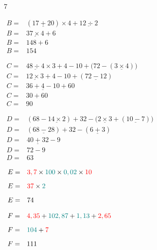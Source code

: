\documentclass[a4paper]{book}
\begin{document}
{\begin{exerciceNote}{7}
\begin{minipage}{0.3\linewidth}
            $\begin{array}{ll}
                B = & (\underline{17+20})\times 4 + \underline{12\div2} \\[2ex]
                B = & \underline{37\times4}+6\\[2ex]
                B = & 148+6\\[2ex]
                B = & 154
            \end{array}$  
        \end{minipage}
        \vline
        \begin{minipage}{0.35\linewidth}
            $\begin{array}{ll}
                C = & \underline{48\div4}\times3+4-10+\bigg(72-(\underline{3\times4})\bigg) \\[2ex]
                C = & \underline{12\times3}+4-10+(\underline{72-12})\\[2ex]
                C = & \underline{36+4-10}+60\\[2ex]
                C = & 30+60\\[2ex]
                C = & 90
            \end{array}$

            \bigskip

            $\begin{array}{ll}
                D = & (68-\underline{14\times2})+32-\big(\underline{2\times3}+(\underline{10-7})\big) \\[2ex]
                D = & (\underline{68-28})+32-(\underline{6+3})\\[2ex]
                D = & \underline{40+32}-9\\[2ex]
                D = & 72-9\\[2ex]
                D = & 63
            \end{array}$
        \end{minipage}
        \vline
        \begin{minipage}{0.3\linewidth}
            $\begin{array}{ll}
                E = & \textcolor{red}{3,7}\times \textcolor{teal}{100} \times \textcolor{teal}{0,02} \times \textcolor{red}{10} \\[2ex]
                E = & \textcolor{red}{37}\times\textcolor{teal}{2}\\[2ex]
                E = &   74
            \end{array}$

            \bigskip

            $\begin{array}{ll}
                F = & \textcolor{red}{4,35} + \textcolor{teal}{102,87}+\textcolor{teal}{1,13}+\textcolor{red}{2,65} \\[2ex]
                F = & \textcolor{teal}{104}+\textcolor{red}{7}\\[2ex]
                F = & 111
            \end{array}$


\end{minipage}
\end{exerciceNote}}
\end{document}
